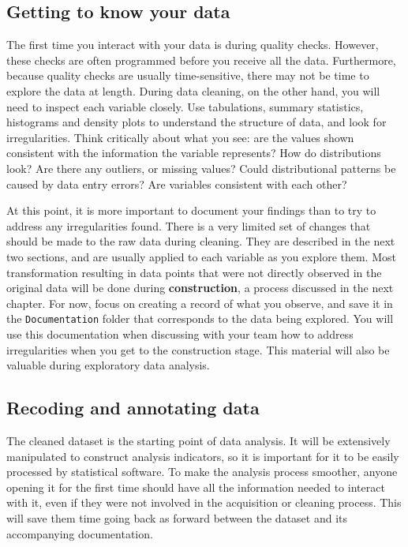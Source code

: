 \begin{fullwidth}
\subsection{Getting to know your data}

The first time you interact with your data is during quality checks.
However, these checks are often programmed before you receive all the data.
Furthermore, because quality checks are usually time-sensitive, 
there may not be time to explore the data at length.
During data cleaning, on the other hand, 
you will need to inspect each variable closely.
Use tabulations, summary statistics, histograms and density plots to understand the structure of data,
and look for irregularities.
Think critically about what you see:
are the values shown consistent with the information the variable represents?
How do distributions look? 
Are there any outliers, or missing values?
Could distributional patterns be caused by data entry errors?
Are variables consistent with each other?

At this point, it is more important to document your findings
than to try to address any irregularities found.
There is a very limited set of changes that should be made to the raw data during cleaning.
They are described in the next two sections,
and are usually applied to each variable as you explore them.
Most transformation resulting in data points that were not directly observed in the original data
will be done during \textbf{construction}, a process discussed in the next chapter.
For now, focus on creating a record of what you observe,
and save it in the \texttt{Documentation} folder that corresponds to the data being explored.
You will use this documentation when discussing with your team
how to address irregularities when you get to the construction stage.
This material will also be valuable during exploratory data analysis.


\subsection{Recoding and annotating data}

The cleaned dataset is the starting point of data analysis.
It will be extensively manipulated to construct analysis indicators,
so it is important for it to be easily processed by statistical software.
To make the analysis process smoother, 
anyone opening it for the first time should have all the information needed to interact with it,
even if they were not involved in the acquisition or cleaning process.
This will save them time going back as forward between the dataset and its accompanying documentation. 


\end{fullwidth}
